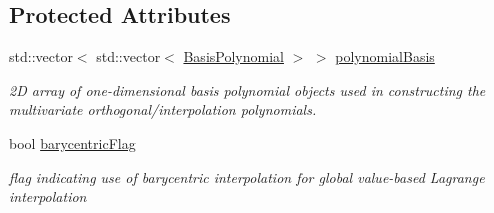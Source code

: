 \subsection*{Protected Attributes}
\begin{DoxyCompactItemize}
\item 
std\+::vector$<$ std\+::vector$<$ \hyperlink{classPecos_1_1BasisPolynomial}{Basis\+Polynomial} $>$ $>$ \hyperlink{classPecos_1_1SharedInterpPolyApproxData_a86109b71b063d95880c10f0290f9a723}{polynomial\+Basis}
\begin{DoxyCompactList}\small\item\em 2D array of one-\/dimensional basis polynomial objects used in constructing the multivariate orthogonal/interpolation polynomials. \end{DoxyCompactList}\item 
bool \hyperlink{classPecos_1_1SharedInterpPolyApproxData_aa7a819fbf65278fd13d9c427041f4c7d}{barycentric\+Flag}\label{classPecos_1_1SharedInterpPolyApproxData_aa7a819fbf65278fd13d9c427041f4c7d}

\begin{DoxyCompactList}\small\item\em flag indicating use of barycentric interpolation for global value-\/based Lagrange interpolation \end{DoxyCompactList}\end{DoxyCompactItemize}
